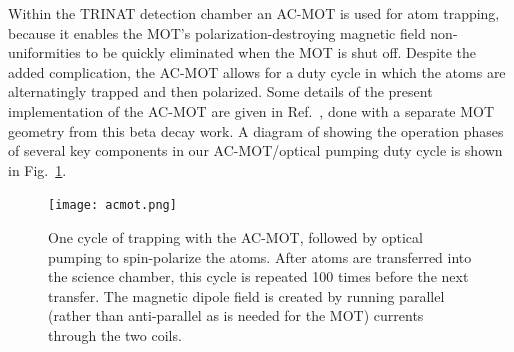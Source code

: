 

Within the \ac{TRINAT} detection chamber an AC-MOT is used for atom trapping, because it enables the \ac{MOT}'s polarization-destroying magnetic field non-uniformities to be quickly eliminated when the \ac{MOT} is shut off.  Despite the added complication, the AC-MOT allows for a duty cycle in which the  atoms are alternatingly trapped and then polarized.
%
Some details of the present implementation of the AC-MOT are given in Ref.~\cite{thesis}, done with a separate MOT geometry from this beta decay work.  A diagram of showing the operation phases of several key components in our AC-MOT/optical pumping duty cycle is shown in Fig.~\ref{fig:acmot}.

\begin{figure}[ht]
	\centering
		\texttt{[image: acmot.png]}
		\caption[The AC-MOT and Optical Pumping Cycle]{One cycle of trapping with the AC-MOT, followed by optical pumping to spin-polarize the atoms.  After atoms are transferred into the science chamber, this cycle is repeated 100 times before the next transfer.  The magnetic dipole field is created by running parallel (rather than anti-parallel as is needed for the MOT) currents through the two coils.  %
		}
		\label{fig:acmot}
\end{figure}


%

